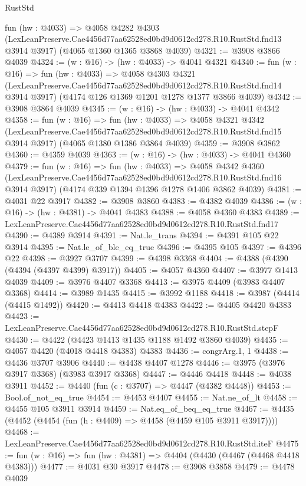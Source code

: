 \begin{lexlean}{RustStd}
\begin{coremodule}
  fun (hw : @4033) =>
  @4058
    @4282
    @4303
    (LexLeanPreserve.Cae4456d77aa62528ed0bd9d0612cd278.R10.RustStd.fnd13 @3914 @3917)
    (@4065 @1360 @1365 @3868 @4039)
@4321 := @3908 @3866 @4039
@4324 := (w : @16) -> (hw : @4033) -> @4041 @4321
@4340 := fun (w : @16) =>
  fun (hw : @4033) =>
  @4058
    @4303
    @4321
    (LexLeanPreserve.Cae4456d77aa62528ed0bd9d0612cd278.R10.RustStd.fnd14 @3914 @3917)
    (@4174 @126 @1369 @1201 @1278 @1377 @3866 @4039)
@4342 := @3908 @3864 @4039
@4345 := (w : @16) -> (hw : @4033) -> @4041 @4342
@4358 := fun (w : @16) =>
  fun (hw : @4033) =>
  @4058
    @4321
    @4342
    (LexLeanPreserve.Cae4456d77aa62528ed0bd9d0612cd278.R10.RustStd.fnd15 @3914 @3917)
    (@4065 @1380 @1386 @3864 @4039)
@4359 := @3908 @3862
@4360 := @4359 @4039
@4363 := (w : @16) -> (hw : @4033) -> @4041 @4360
@4379 := fun (w : @16) =>
  fun (hw : @4033) =>
  @4058
    @4342
    @4360
    (LexLeanPreserve.Cae4456d77aa62528ed0bd9d0612cd278.R10.RustStd.fnd16 @3914 @3917)
    (@4174 @339 @1394 @1396 @1278 @1406 @3862 @4039)
@4381 := @4031 @22 @3917
@4382 := @3908 @3860
@4383 := @4382 @4039
@4386 := (w : @16) -> (hw : @4381) -> @4041 @4383
@4388 := @4058 @4360 @4383
@4389 := LexLeanPreserve.Cae4456d77aa62528ed0bd9d0612cd278.R10.RustStd.fnd17
@4390 := @4389 @3914
@4391 := Nat.le_trans
@4394 := @4391 @105 @22 @3914
@4395 := Nat.le_of_ble_eq_true
@4396 := @4395 @105
@4397 := @4396 @22
@4398 := @3927 @3707
@4399 := @4398 @3368
@4404 := @4388 (@4390 (@4394 (@4397 @4399) @3917))
@4405 := @4057 @4360
@4407 := @3977 @1413 @4039
@4409 := @3976 @4407 @3368
@4413 := @3975 @4409 (@3983 @4407 @3368)
@4414 := @3989 @1435
@4415 := @3992 @1188
@4418 := @3987 (@4414 (@4415 @1492))
@4420 := @4413 @4418 @4383
@4422 := @4405 @4420 @4383
@4423 := LexLeanPreserve.Cae4456d77aa62528ed0bd9d0612cd278.R10.RustStd.stepF
@4430 := @4422 (@4423 @1413 @1435 @1188 @1492 @3860 @4039)
@4435 := @4057 @4420 (@4018 @4418 @4383) @4383
@4436 := congrArg.{1, 1}
@4438 := @4436 @3707 @3906
@4440 := @4438 @4407 @1278
@4446 := @3975 (@3976 @3917 @3368) (@3983 @3917 @3368)
@4447 := @4446 @4418
@4448 := @4038 @3911
@4452 := @4440 (fun (c : @3707) => @4447 (@4382 @4448))
@4453 := Bool.of_not_eq_true
@4454 := @4453 @4407
@4455 := Nat.ne_of_lt
@4458 := @4455 @105 @3911 @3914
@4459 := Nat.eq_of_beq_eq_true
@4467 := @4435 (@4452 (@4454 (fun (h : @4409) => @4458 (@4459 @105 @3911 @3917))))
@4468 := LexLeanPreserve.Cae4456d77aa62528ed0bd9d0612cd278.R10.RustStd.iteF
@4475 := fun (w : @16) => fun (hw : @4381) => @4404 (@4430 (@4467 (@4468 @4418 @4383)))
@4477 := @4031 @30 @3917
@4478 := @3908 @3858
@4479 := @4478 @4039

\end{coremodule}
\end{lexlean}
